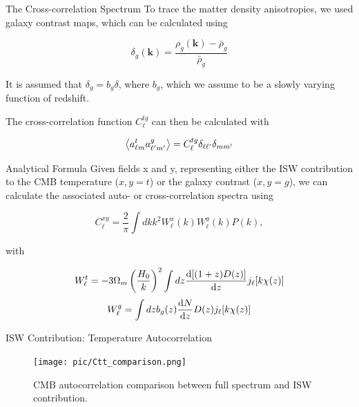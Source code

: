 \documentclass[serif, aspectratio=169]{beamer}
\begin{document}
\begin{frame}{The Cross-correlation Spectrum}
    To trace the matter density anisotropies, we used galaxy contrast maps, which can be calculated using

    \begin{equation}
        \delta_g(\mathbf{k})=\frac{\rho_g(\mathbf{k})-\bar{\rho}_g}{\bar{\rho}_g}
    \end{equation}

    It is assumed that $\delta_g=b_g\delta$, where $b_g$, which we assume to be a slowly varying function of redshift. 

    The cross-correlation function $C_\ell^{tg}$ can then be calculated with

    \begin{equation}
        \left\langle a_{\ell m}^t a_{\ell'm'}^g \right\rangle=C_\ell^{tg}\delta_{\ell \ell'}\delta_{mm'}
    \end{equation}
\end{frame}

\begin{frame}{Analytical Formula}
    Given fields x and y, representing either the ISW contribution to the CMB temperature ($x,y=t$) or the galaxy contrast ($x,y=g$), we can calculate the associated auto- or cross-correlation spectra using

    \begin{equation}
        C_\ell^{xy}=\frac{2}{\pi}\int dk k^2 W_\ell^x(k)W_\ell^y(k)P(k),
    \end{equation}

    with

    \begin{equation}
        W_\ell^t=-3\Omega_m\left(\frac{H_0}{k}\right)^2\int dz \dv{[(1+z)D(z)]}{z}j_\ell[k\chi(z)]
    \end{equation}
    \begin{equation}\label{Wg}
        W_\ell^g=\int dz b_g(z)\dv{N}{z}D(z)j_\ell[k\chi(z)]
    \end{equation}
\end{frame}

\begin{frame}{ISW Contribution: Temperature Autocorrelation}
    \begin{figure}
        \centering
        \texttt{[image: pic/Ctt\_comparison.png]}
        \caption{CMB autocorrelation comparison between full spectrum and ISW contribution.}
        \label{fig:ISWplots_Ctt}
    \end{figure}
\end{frame}
\end{document}
